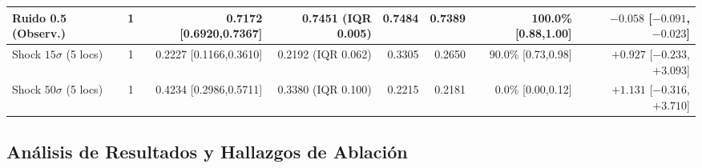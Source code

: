 \documentclass[aip,cha,reprint,amsmath,amssymb]{revtex4-2}
\begin{document}
\begin{table}[t]
\begin{ruledtabular}
\begin{tabular}{lcrrrrrr}
Ruido 0.5 (Observ.) & 1 & \textbf{0.7172} [0.6920,0.7367] & 0.7451 (IQR 0.005) & 0.7484 & 0.7389 & \textbf{100.0\%} [0.88,1.00] & $-0.058$ [$-0.091$,$-0.023$] \\
\midrule
Shock $15\sigma$ (5 locs) & 1 & 0.2227 [0.1166,0.3610] & 0.2192 (IQR 0.062) & 0.3305 & 0.2650 & 90.0\% [0.73,0.98] & $+0.927$ [$-0.233$,$+3.093$] \\
Shock $50\sigma$ (5 locs) & 1 & 0.4234 [0.2986,0.5711] & 0.3380 (IQR 0.100) & 0.2215 & 0.2181 & 0.0\% [0.00,0.12] & $+1.131$ [$-0.316$,$+3.710$] \\
\end{tabular}
\end{ruledtabular}
\end{table}

\subsection{Análisis de Resultados y Hallazgos de Ablación}
\end{document}
